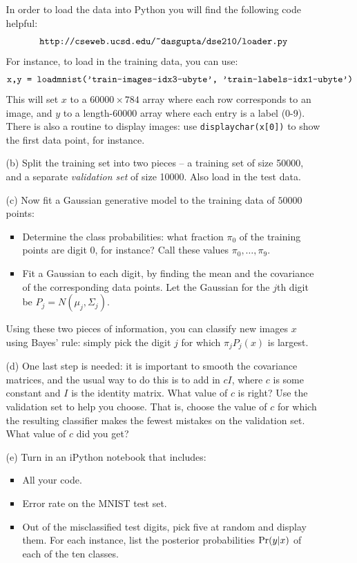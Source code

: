 \documentclass[10pt]{report}
\theoremstyle{plain}
\theoremstyle{definition}
\newcommand{\pr}{\mbox{\rm Pr}}
\begin{document}
\begin{enumerate}
\begin{enumerate}
In order to load the data into Python you will find the following code helpful:
$$ \mbox{\tt http://cseweb.ucsd.edu/\~{}dasgupta/dse210/loader.py} $$
For instance, to load in the training data, you can use:
$$ \mbox{\tt x,y = loadmnist('train-images-idx3-ubyte', 'train-labels-idx1-ubyte')} $$
This will set $x$ to a $60000 \times 784$ array where each row corresponds to an image, and $y$ to a length-$60000$ array where each entry is a label (0-9). There is also a routine to display images: use {\tt displaychar(x[0])} to show the first data point, for instance.

\item[(b)] Split the training set into two pieces -- a training set of size 50000, and a separate {\it validation set} of size 10000. Also load in the test data.

\item[(c)] Now fit a Gaussian generative model to the training data of $50000$ points:
\begin{itemize}
\item Determine the class probabilities: what fraction $\pi_0$ of the training points are digit 0, for instance? Call these values $\pi_0, \ldots, \pi_9$.
\item Fit a Gaussian to each digit, by finding the mean and the covariance of the corresponding data points. Let the Gaussian for the $j$th digit be $P_j = N(\mu_j, \Sigma_j)$.
\end{itemize}
Using these two pieces of information, you can classify new images $x$ using Bayes' rule: simply pick the digit $j$ for which $\pi_j P_j(x)$ is largest.

\item[(d)] One last step is needed: it is important to smooth the covariance matrices, and the usual way to do this is to add in $c I$, where $c$ is some constant and $I$ is the identity matrix. What value of $c$ is right? Use the validation set to help you choose. That is, choose the value of $c$ for which the resulting classifier makes the fewest mistakes on the validation set. What value of $c$ did you get?
  
\item[(e)] Turn in an iPython notebook that includes:
\begin{itemize}
\item All your code.
\item Error rate on the MNIST test set.
\item Out of the misclassified test digits, pick five at random and display them. For each instance, list the posterior probabilities $\pr(y|x)$ of each of the ten classes.
\end{itemize}
\end{enumerate}

\end{enumerate}
\end{document}
